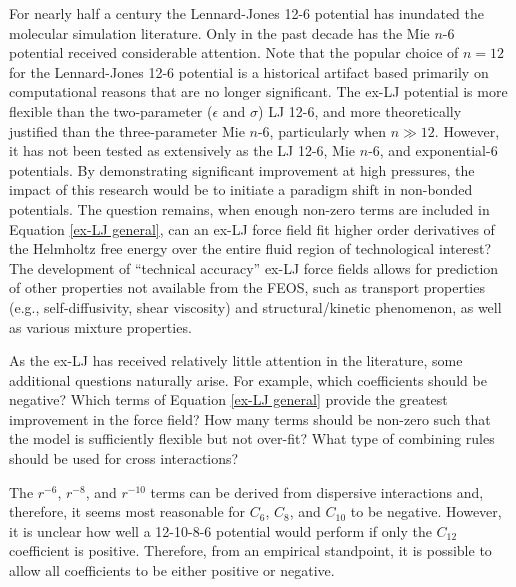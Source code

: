\documentclass[11pt,a4paper]{article}
\begin{document}
For nearly half a century the Lennard-Jones 12-6 potential has inundated the molecular simulation literature. Only in the past decade has the Mie $n$-6 potential received considerable attention. Note that the popular choice of $n =12 $ for the Lennard-Jones 12-6 potential is a historical artifact based primarily on computational reasons that are no longer significant. The ex-LJ potential is more flexible than the two-parameter ($\epsilon$ and $\sigma$) LJ 12-6, and more theoretically justified than the three-parameter Mie $n$-6, particularly when $n \gg 12$. However, it has not been tested as extensively as the LJ 12-6, Mie $n$-6, and exponential-6 potentials. By demonstrating significant improvement at high pressures, the impact of this research would be to initiate a paradigm shift in non-bonded potentials. The question remains, when enough non-zero terms are included in Equation \ref{ex-LJ general}, can an ex-LJ force field fit higher order derivatives of the Helmholtz free energy over the entire fluid region of technological interest? The development of ``technical accuracy'' ex-LJ force fields allows for prediction of other properties not available from the FEOS, such as transport properties (e.g., self-diffusivity, shear viscosity) and structural/kinetic phenomenon, as well as various mixture properties. 


As the ex-LJ has received relatively little attention in the literature, some additional questions naturally arise. For example, which coefficients should be negative? Which terms of Equation \ref{ex-LJ general} provide the greatest improvement in the force field? How many terms should be non-zero such that the model is sufficiently flexible but not over-fit? What type of combining rules should be used for cross interactions? 

The $r^{-6}$, $r^{-8}$, and $r^{-10}$ terms can be derived from dispersive interactions and, therefore, it seems most reasonable for $C_6$, $C_8$, and $C_{10}$ to be negative. However, it is unclear how well a 12-10-8-6 potential would perform if only the $C_{12}$ coefficient is positive. Therefore, from an empirical standpoint, it is possible to allow all coefficients to be either positive or negative.
\end{document}
